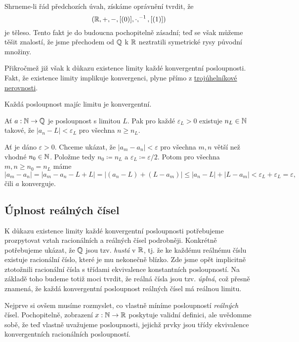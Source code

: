 Shrneme-li řád předchozích úvah, získáme oprávnění tvrdit, že
\[
 (\mathbb{R},+,-,[(0)], \cdot,^{-1},[(1)])
\]
je těleso. Tento fakt je do budoucna pochopitelně zásadní; teď se však můžeme
těšit znalostí, že jsme přechodem od $\mathbb{Q}$ k $\mathbb{R}$ neztratili symetrické rysy
původní množiny.

Přikročmež již však k důkazu existence limity každé konvergentní posloupnosti.
Fakt, že existence limity implikuje konvergenci, plyne přímo z
\hyperref[lem:trojuhelnikova-nerovnost]{trojúhelníkové nerovnosti}.

\begin{lemma}{}{}
 Každá posloupnost majíc limitu je konvergentní.
\end{lemma}
\begin{lemproof}
 Ať $a:\mathbb{N} \to \mathbb{Q}$ je posloupnost s limitou $L$. Pak pro každé $\varepsilon_L>0$
 existuje $n_L \in \mathbb{N}$ takové, že $|a_n - L| < \varepsilon_L$ pro všechna $n
 \geq n_L$.

 Ať je dáno $\varepsilon>0$. Chceme ukázat, že $|a_m - a_n| < \varepsilon$ pro
 všechna $m,n$ větší než vhodné $n_0 \in \mathbb{N}$. Položme tedy $n_0 \coloneqq n_L$ a
 $\varepsilon_L \coloneqq \varepsilon / 2$. Potom pro všechna $m,n \geq n_0 =
 n_L$ máme
 \[
  |a_m - a_n| = |a_m - a_n - L + L| = |(a_n - L) + (L - a_m)| \leq |a_n - L| +
  |L - a_m| < \varepsilon_L + \varepsilon_L = \varepsilon,
 \]
 čili $a$ konverguje.
\end{lemproof}

\subsection{Úplnost reálných čísel}
\label{ssec:uplnost-realnych-cisel}

K důkazu existence limity každé konvergentní posloupnosti potřebujeme
prozpytovat vztah racionálních a reálných čísel podrobněji. Konkrétně
potřebujeme ukázat, že $\mathbb{Q}$ jsou tzv. \emph{hustá} v $\mathbb{R}$, tj. že ke každému
reálnému číslu existuje racionální číslo, které je mu nekonečně blízko. Zde jsme
opět implicitně ztotožnili racionální čísla s třídami ekvivalence konstantních
posloupností. Na základě toho budeme totiž moci tvrdit, že reálná čísla jsou
tzv. \emph{úplná}, což přesně znamená, že každá konvergentní posloupnost
reálných čísel má reálnou limitu.

Nejprve si ovšem musíme rozmyslet, co vlastně míníme posloupností
\emph{reálných} čísel. Pochopitelně, zobrazení $x:\mathbb{N} \to \mathbb{R}$ poskytuje validní
definici, ale uvědomme sobě, že teď vlastně uvažujeme posloupnosti, jejichž
prvky jsou třídy ekvivalence konvergentních racionálních posloupností.

